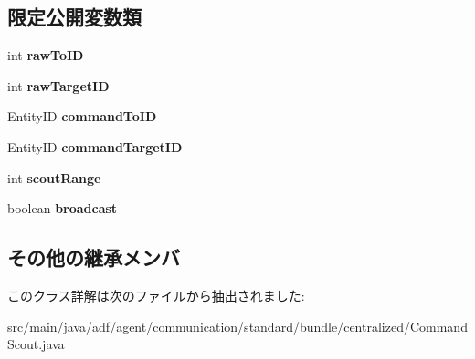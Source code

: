 \subsection*{限定公開変数類}
\begin{DoxyCompactItemize}
\item 
\hypertarget{classadf_1_1agent_1_1communication_1_1standard_1_1bundle_1_1centralized_1_1CommandScout_a1f60975ba8efdff7cd14d27b15f5df79}{}\label{classadf_1_1agent_1_1communication_1_1standard_1_1bundle_1_1centralized_1_1CommandScout_a1f60975ba8efdff7cd14d27b15f5df79} 
int {\bfseries raw\+To\+ID}
\item 
\hypertarget{classadf_1_1agent_1_1communication_1_1standard_1_1bundle_1_1centralized_1_1CommandScout_a83a07a8511379eab334bb2acf99c19f2}{}\label{classadf_1_1agent_1_1communication_1_1standard_1_1bundle_1_1centralized_1_1CommandScout_a83a07a8511379eab334bb2acf99c19f2} 
int {\bfseries raw\+Target\+ID}
\item 
\hypertarget{classadf_1_1agent_1_1communication_1_1standard_1_1bundle_1_1centralized_1_1CommandScout_a02ec990c0adfac132a48a2b0b637b1ca}{}\label{classadf_1_1agent_1_1communication_1_1standard_1_1bundle_1_1centralized_1_1CommandScout_a02ec990c0adfac132a48a2b0b637b1ca} 
Entity\+ID {\bfseries command\+To\+ID}
\item 
\hypertarget{classadf_1_1agent_1_1communication_1_1standard_1_1bundle_1_1centralized_1_1CommandScout_ac064c242a5757c9e4063391192ca1f0e}{}\label{classadf_1_1agent_1_1communication_1_1standard_1_1bundle_1_1centralized_1_1CommandScout_ac064c242a5757c9e4063391192ca1f0e} 
Entity\+ID {\bfseries command\+Target\+ID}
\item 
\hypertarget{classadf_1_1agent_1_1communication_1_1standard_1_1bundle_1_1centralized_1_1CommandScout_a9378ee2673497c99bda86473501ea9b1}{}\label{classadf_1_1agent_1_1communication_1_1standard_1_1bundle_1_1centralized_1_1CommandScout_a9378ee2673497c99bda86473501ea9b1} 
int {\bfseries scout\+Range}
\item 
\hypertarget{classadf_1_1agent_1_1communication_1_1standard_1_1bundle_1_1centralized_1_1CommandScout_a5b36747655353d8ac8db0c6d81893baf}{}\label{classadf_1_1agent_1_1communication_1_1standard_1_1bundle_1_1centralized_1_1CommandScout_a5b36747655353d8ac8db0c6d81893baf} 
boolean {\bfseries broadcast}
\end{DoxyCompactItemize}
\subsection*{その他の継承メンバ}


このクラス詳解は次のファイルから抽出されました\+:\begin{DoxyCompactItemize}
\item 
src/main/java/adf/agent/communication/standard/bundle/centralized/Command\+Scout.\+java\end{DoxyCompactItemize}
